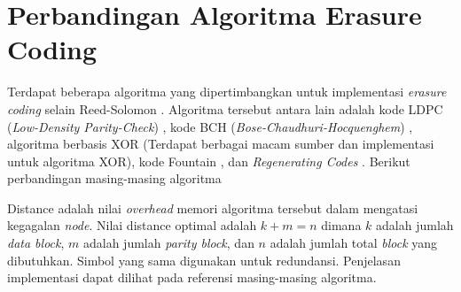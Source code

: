 \chapter{Perbandingan Algoritma Erasure Coding}
\label{appendix:ec-algorithms}

Terdapat beberapa algoritma yang dipertimbangkan untuk implementasi \textit{erasure coding} selain Reed-Solomon \parencite{manasse2009reed}. Algoritma tersebut antara lain adalah kode LDPC (\textit{Low-Density Parity-Check}) \parencite{gallagher1962ldpc}, kode BCH (\textit{Bose-Chaudhuri-Hocquenghem}) \parencite{bose1960bch}, algoritma berbasis XOR (Terdapat berbagai macam sumber dan implementasi untuk algoritma XOR), kode Fountain \parencite{asteris2014fountain}, dan \textit{Regenerating Codes} \parencite{rashmi2012regenerating}. Berikut perbandingan masing-masing algoritma 

\begin{table}[ht]
    \centering
    \caption{Perbandingan algoritma erasure coding}
    \label{tab:ec-algorithm}
\end{table}

Distance adalah nilai \textit{overhead} memori algoritma tersebut dalam mengatasi kegagalan \textit{node}. Nilai distance optimal adalah $k + m = n$ dimana $k$ adalah jumlah \textit{data block}, $m$ adalah jumlah \textit{parity block}, dan $n$ adalah jumlah total \textit{block} yang dibutuhkan. Simbol yang sama digunakan untuk redundansi. Penjelasan implementasi dapat dilihat pada referensi masing-masing algoritma.